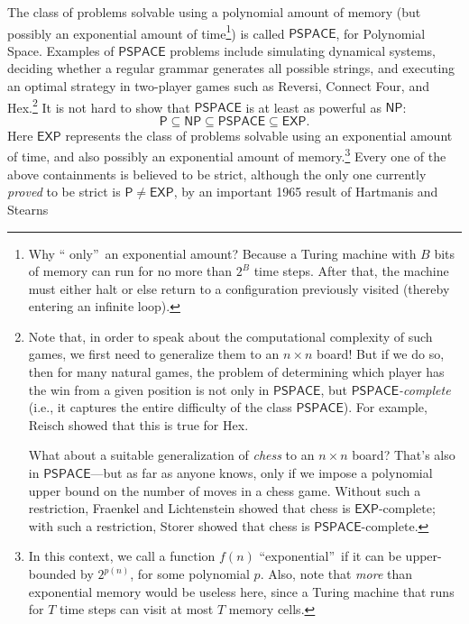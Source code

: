 \documentclass[12pt,onecolumn]{article}%
\begin{document}
The class of problems solvable using a polynomial amount of memory (but
possibly an exponential amount of time\footnote{Why \textquotedblleft
only\textquotedblright\  an exponential amount? Because a Turing machine with
$B$ bits of memory can run for no more than $2^{B}$ time steps. After
that, the machine must either halt or else return to a configuration
previously visited (thereby entering an infinite loop).}) is called
$\mathsf{PSPACE}$, for Polynomial Space. Examples of $\mathsf{PSPACE}%
$ problems include simulating dynamical systems, deciding whether a regular
grammar generates all possible strings, and executing an optimal strategy in
two-player games such as Reversi, Connect Four, and
Hex.\footnote{\label{chessnote}Note that, in order to speak about the
computational complexity of such games, we first need to generalize them to an
$n\times n$ board! But if we do so, then for many natural games, the
problem of determining which player has the win from a given position is not
only in $\mathsf{PSPACE}$, but $\mathsf{PSPACE}$\textit{-complete} (i.e., it
captures the entire difficulty of the class $\mathsf{PSPACE}$). For example,
Reisch \cite{reisch} showed that this is true for Hex.
\par
What about a suitable generalization of \textit{chess} to an $n\times
n$ board? That's also in $\mathsf{PSPACE}$---but as far as anyone knows,
only if we impose a polynomial upper bound on the number of moves in a chess
game. Without such a restriction, Fraenkel and Lichtenstein \cite{fraenkel}
showed that chess is $\mathsf{EXP}$-complete; with such a restriction, Storer
\cite{storer} showed that chess is $\mathsf{PSPACE}$-complete.} It is not
hard to show that $\mathsf{PSPACE}$ is at least as powerful as $\mathsf{NP}$:%
\[
\mathsf{P}\subseteq\mathsf{NP}\subseteq\mathsf{PSPACE}\subseteq\mathsf{EXP}.
\]
Here $\mathsf{EXP}$ represents the class of problems solvable using an
exponential amount of time, and also possibly an exponential amount of
memory.\footnote{In this context, we call a function $f\left(  n\right)
$ \textquotedblleft exponential\textquotedblright\  if it can be upper-bounded
by $2^{p\left(  n\right)  }$, for some polynomial $p$. Also, note that
\textit{more} than exponential memory would be useless here, since a Turing
machine that runs for $T$ time steps can visit at most $T$ memory cells.}
 Every one of the above containments is believed to be strict, although the
only one currently \textit{proved} to be strict is $\mathsf{P}\neq
\mathsf{EXP}$, by an important 1965 result of Hartmanis and Stearns
\end{document}
